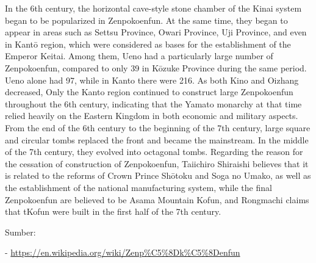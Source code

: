 \begin{tcolorbox}[breakable, colback=white, colframe=black!80,
  boxrule=0.6pt, arc=0mm, left=3mm, right=3mm, top=2mm, bottom=2mm]
In the 6th century, the horizontal cave-{}style stone chamber of the Kinai system began to be popularized in Zenpokoenfun. At the same time, they began to appear in areas such as Settsu Province, Owari Province, Uji Province, and even in Kantō region, which were considered as bases for the establishment of the Emperor Keitai. Among them, Ueno had a particularly large number of Zenpokoenfun, compared to only 39 in Kōzuke Province during the same period. Ueno alone had 97, while in Kanto there were 216. As both Kino and Oizhang decreased, Only the Kanto region continued to construct large Zenpokoenfun throughout the 6th century, indicating that the Yamato monarchy at that time relied heavily on the Eastern Kingdom in both economic and military aspects. From the end of the 6th century to the beginning of the 7th century, large square and circular tombs replaced the front and became the mainstream. In the middle of the 7th century, they evolved into octagonal tombs. Regarding the reason for the cessation of construction of Zenpokoenfun, Taiichiro Shiraishi believes that it is related to the reforms of Crown Prince Shōtoku and Soga no Umako, as well as the establishment of the national manufacturing system, while the final Zenpokoenfun are believed to be Asama Mountain Kofun, and Rongmachi claims that tKofun were built in the first half of the 7th century.\par
\bigskip
Sumber:\par
\hspace*{1.5em}- \url{https://en.wikipedia.org/wiki/Zenp\%C5\%8Dk\%C5\%8Denfun}
\end{tcolorbox}
